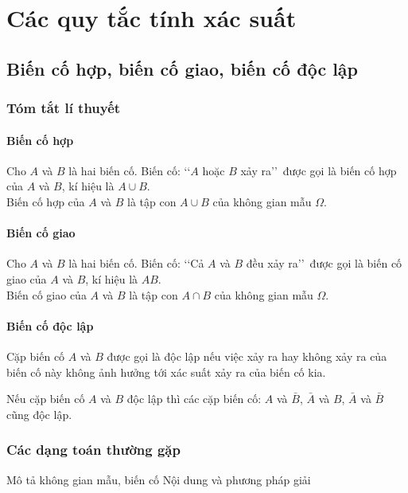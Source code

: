 \chapter{Các quy tắc tính xác suất}
\section{Biến cố hợp, biến cố giao, biến cố độc lập}
\subsection{Tóm tắt lí thuyết}
\begin{tomtat}
	\subsubsection{Biến cố hợp}
	\begin{dn}
		Cho $A$ và $B$ là hai biến cố. Biến cố: \lq\lq $A$ hoặc $B$ xảy ra\rq\rq\ được gọi là biến cố hợp của $A$ và $B$, kí hiệu là $A \cup B$.\\
		Biến cố hợp của $A$ và $B$ là tập con $A \cup B$ của không gian mẫu $\Omega$.
	\end{dn}
	\subsubsection{Biến cố giao}
	\begin{dn}
		Cho $A$ và $B$ là hai biến cố. Biến cố: \lq\lq Cả $A$ và $B$ đều xảy ra\rq\rq\ được gọi là biến cố giao của $A$ và $B$, kí hiệu là $A B$.\\
		Biến cố giao của $A$ và $B$ là tập con $A \cap B$ của không gian mẫu $\Omega$.
	\end{dn}
	\subsubsection{Biến cố độc lập}
	\begin{dn}
		Cặp biến cố $A$ và $B$ được gọi là độc lập nếu việc xảy ra hay không xảy ra của biến cố này không ảnh hưởng tới xác suất xảy ra của biến cố kia. 
	\end{dn}
	\begin{note}
		Nếu cặp biến cố $A$ và $B$ độc lập thì các cặp biến cố: $A$ và $\bar{B}$, $\bar{A}$ và $B$, $\bar{A}$ và $\bar{B}$ cũng độc lập.
	\end{note}
\end{tomtat}
\subsection{Các dạng toán thường gặp}
\begin{dang}{Mô tả không gian mẫu, biến cố}
	Nội dung và phương pháp giải
\end{dang}
